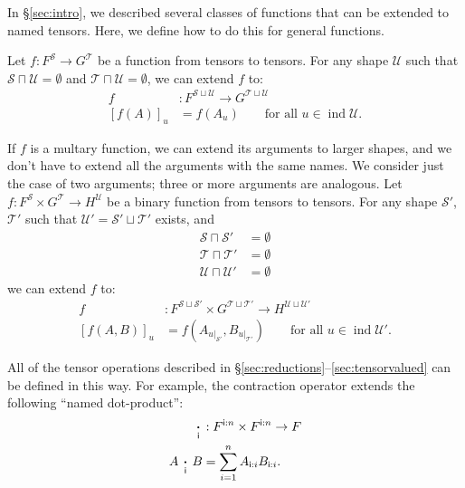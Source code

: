 \documentclass{article}
\newcommand{\name}[1]{\mathsf{#1}}
\newcommand{\ndot}[1]{\mathbin{\mathop{\thinspace\boldsymbol\cdot\thinspace}\displaylimits_{\name{#1}}}}
\DeclareMathOperator{\tupleshape}{ind}
\newcommand{\tuplerestrict}[2]{\left.#1\right|_{#2}}
\begin{document}
In \S\ref{sec:intro}, we described several classes of functions that can be extended to named tensors. Here, we define how to do this for general functions.

Let $f \colon F^{\mathcal{S}} \rightarrow G^{\mathcal{T}}$ be a function from tensors to tensors. For any shape $\mathcal{U}$ such that $\mathcal{S} \sqcap \mathcal{U} = \emptyset$ and $\mathcal{T} \sqcap \mathcal{U} = \emptyset$, we can extend $f$ to:
\begin{align*}
f &: F^{\mathcal{S} \sqcup \mathcal{U}} \rightarrow G^{\mathcal{T} \sqcup \mathcal{U}} \\
[f(A)]_u &= f(A_u) \qquad \text{for all $u \in \tupleshape\mathcal{U}$.}
\end{align*}

If $f$ is a multary function, we can extend its arguments to larger shapes, and we don't have to extend all the arguments with the same names. We consider just the case of two arguments; three or more arguments are analogous. Let $f \colon F^{\mathcal{S}} \times G^{\mathcal{T}} \rightarrow H^{\mathcal{U}}$ be a binary function from tensors to tensors. For any shape $\mathcal{S'}$, $\mathcal{T'}$ such that $\mathcal{U'} = \mathcal{S'} \sqcup \mathcal{T'}$ exists, and 
\begin{align*}
\mathcal{S} \sqcap \mathcal{S'} &= \emptyset \\
\mathcal{T} \sqcap \mathcal{T'} &= \emptyset \\
\mathcal{U} \sqcap \mathcal{U'} &= \emptyset \end{align*}
we can extend $f$ to:
\begin{align*}
f &: F^{\mathcal{S} \sqcup \mathcal{S'}} \times G^{\mathcal{T} \sqcup \mathcal{T'}} \rightarrow H^{\mathcal{U} \sqcup \mathcal{U'}} \\
  [f(A,B)]_u &= f\left(A_{\tuplerestrict{u}{\mathcal{S'}}},B_{\tuplerestrict{u}{\mathcal{T'}}}\right) \qquad \text{for all $u \in \tupleshape\mathcal{U'}$.}
\end{align*}

All of the tensor operations described in \S\ref{sec:reductions}--\ref{sec:tensorvalued} can be defined in this way. For example, the contraction operator extends the following ``named dot-product'':
\begin{align*}
\ndot{i} &: F^{\name{i}:n} \times F^{\name{i}:n} \rightarrow F \\
A \ndot{i} B &= \sum_{i=1}^n A_{\name{i}:i} B_{\name{i}:i}.
\end{align*}
\end{document}
